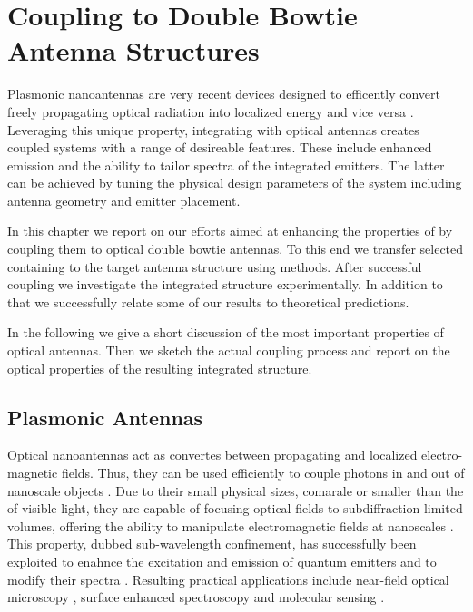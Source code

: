 \section[Coupling \Nds to Optical Antennas]{Coupling \Nds to Double Bowtie Antenna Structures} \label{sec::coupling_antennas}

	Plasmonic nanoantennas are very recent devices designed to efficently convert freely propagating optical radiation into localized energy and vice versa \cite{Optical Antennas, Palash Bharadwaj, Bradley Deutsch, and Lukas Novotny, nancy::77, nancy::78}. Leveraging this unique property, integrating \sivs with optical antennas creates coupled systems with a range of desireable features. These include enhanced \pl emission and the ability to tailor \pl spectra of the integrated emitters. The latter can be achieved by tuning the physical design parameters of the system including antenna geometry and emitter placement.

	In this chapter we report on our efforts aimed at enhancing the properties of \sivs by coupling them to optical double bowtie antennas. To this end we transfer selected \nds containing \sivs to the target antenna structure using \pp methods. After successful coupling we investigate the integrated structure experimentally. In addition to that we successfully relate some of our results to theoretical predictions.

	In the following we give a short discussion of the most important properties of optical antennas. Then we sketch the actual coupling process and report on the optical properties of the resulting integrated structure.

	\subsection{Plasmonic Antennas}

		Optical nanoantennas act as convertes between propagating and localized electro-magnetic fields. Thus, they can be used efficiently to couple photons in and out of nanoscale objects \cite{Curto2010}. Due to their small physical sizes, comarale or smaller than the \wl of visible light, they are capable of focusing optical fields to subdiffraction-limited volumes, offering the ability to manipulate electromagnetic fields at nanoscales \cite{Curto2010::3, nancy::78}. This property, dubbed sub-wavelength confinement, has successfully been exploited to enahnce the excitation and emission of quantum emitters \cite{Curto2010::4, Curto2010::5, Curto2010::6, Curto2010::7} and to modify their spectra \cite{Curto2010::8}. Resulting practical applications include near-field optical microscopy \cite{nancy::79}, surface enhanced spectroscopy \cite{nancy::80, nancy::81} and molecular sensing \cite{nancy::82}.


